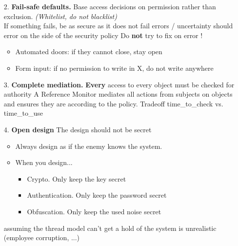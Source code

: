 \documentclass[8pt]{article}
\begin{document}
\begin{minipage}[htp]{0.49\textwidth}
\begin{itemize}
		\item[2.]\textbf{Fail-safe defaults.} Base access decisions on permission rather than exclusion. \textit{(Whitelist, do not blacklist)} \\
		      If something fails, be as secure as it does not fail errors / uncertainty should error on the side of the security policy
		      Do \textbf{not} try to fix on error !
		      \begin{itemize}
			      \item Automated doors: if they cannot close, stay open
			      \item Form input: if no permission to write in X, do not write anywhere
		      \end{itemize}
		\item[3.]  \textbf{Complete mediation.}
		      \textbf{Every} access to every object must be checked for authority
		      A Reference Monitor mediates all actions from subjects on objects and ensures they are according to the policy. Tradeoff time\_to\_check vs. time\_to\_use
		\item[4.] \textbf{Open design} The design should not be secret
		      \begin{itemize}
			      \item Always design as if the enemy knows the system.
			      \item When you design...
			            \begin{itemize}
				            \item	Crypto. Only keep the key secret
				            \item Authentication. Only keep the password secret
				            \item Obfuscation. Only keep the used noise secret
			            \end{itemize}
		      \end{itemize} assuming the thread model can't get a hold of the system is unrealistic (employee corruption, ...)
	\end{itemize}
\end{minipage}
\hfill
\end{document}
